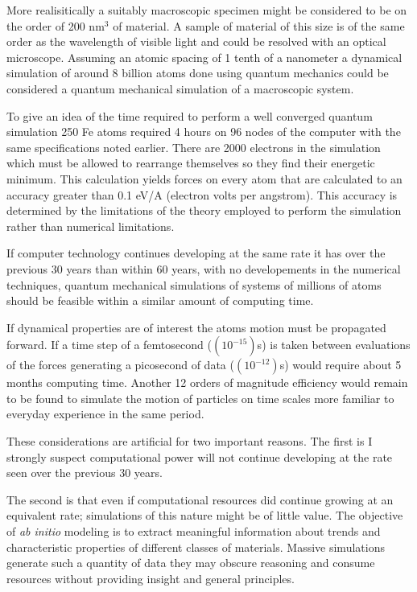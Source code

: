 More realisitically a suitably macroscopic specimen might be considered to be on the 
order of 200 nm$^{3}$ of material. A sample of material of this size is of the 
same order as the wavelength of visible light and could be
resolved with an optical microscope. Assuming an atomic spacing of 1 tenth of a nanometer 
a dynamical simulation of around 8 billion atoms done using quantum mechanics 
could be considered a quantum mechanical simulation of a macroscopic system. 

To give an idea of the time required to perform a well converged quantum simulation 
250 Fe atoms required 4 hours on 96 nodes of the computer with the same 
specifications noted earlier. There are 2000 electrons in the simulation which must be allowed
to rearrange themselves so they find their energetic minimum. This calculation yields forces on every 
atom that are calculated to an accuracy greater than 0.1 eV/A (electron volts per angstrom).
This accuracy is determined by the limitations of the theory employed to perform the simulation
rather than numerical limitations.

If computer technology continues developing at the same rate it has
over the previous 30 years than within 60 years, with no developements in the numerical techniques, 
quantum mechanical simulations of systems of millions of atoms should be feasible
within a similar amount of computing time. 

If dynamical properties are of interest the atoms motion must be propagated forward. 
If a time step of a femtosecond ($(10^{-15})$s) is taken between evaluations of the 
forces generating a picosecond of data ($(10^{-12})$s) would require about 5 months 
computing time. Another 12 orders of magnitude efficiency would remain to be found to 
simulate the motion of particles on time scales more familiar to everyday experience
in the same period.

These considerations are artificial for two important reasons. The first
is I strongly suspect computational power will not continue developing at the rate
seen over the previous 30 years. 

The second is that even if computational resources did continue growing 
at an equivalent rate; simulations of this nature might be of little value.
The objective of {\it ab initio} modeling is to extract meaningful information
about trends and characteristic properties of different classes of materials. 
Massive simulations generate such a quantity of data they may obscure 
reasoning and consume resources without providing insight and general principles.

